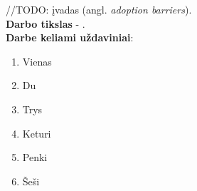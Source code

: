 //TODO: įvadas (angl. \textit{adoption barriers}).
\\

\textbf{Darbo tikslas} - .
\\

\textbf{Darbe keliami uždaviniai}:

\begin{enumerate}
    \item Vienas
    \item Du
    \item Trys
    \item Keturi
    \item Penki
    \item Šeši
\end{enumerate}